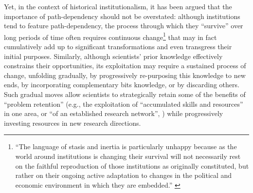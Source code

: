 \documentclass{article}
\begin{document}
Yet, in the context of historical institutionalism, it has been argued that the importance of path-dependency should not be overstated: although institutions tend to feature path-dependency, the process through which they ``survive'' over long periods of time often requires continuous change\footnote{``The language of stasis and inertia is particularly unhappy because as the world around institutions is changing their survival will not necessarily rest on the faithful reproduction of those institutions as originally constituted, but rather on their ongoing active adaptation to changes in the political and economic environment in which they are embedded.'' \citep[p.~293]{Thelen2004}} that may in fact cumulatively add up to significant transformations and even transgress their initial purposes. Similarly, although scientists' prior knowledge effectively constrains their opportunities, its exploitation may require a sustained process of change, unfolding gradually, by progressively re-purposing this knowledge to new ends, by incorporating complementary bits knowledge, or by discarding others. Such gradual moves allow scientists to strategically retain some of  the benefits of ``problem retention'' (e.g., the exploitation of ``accumulated skills and resources'' in one area, or ``of an established research network'', \citealt[p.~106]{Gieryn1978}) while progressively investing resources in new research directions.



\end{document}

